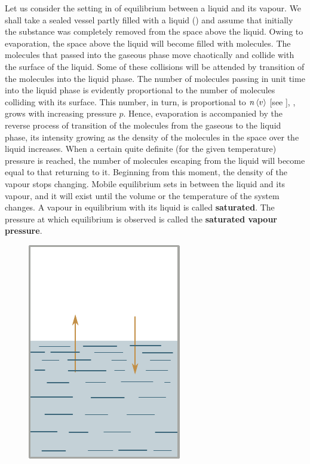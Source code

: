 Let us consider the setting in of equilibrium between a liquid and its vapour. We shall take a sealed vessel partly filled with a liquid () and assume that initially the substance was completely removed from the space above the liquid. Owing to evaporation, the space above the liquid will become filled with molecules. The molecules that passed into the gaseous phase move chaotically and collide with the surface of the liquid. Some of these collisions will be attended by transition of the molecules into the liquid phase. The number of molecules passing in unit time into the liquid phase is evidently proportional to the number of molecules colliding with its surface. This number, in turn, is proportional to $n\left\langle v \right\rangle$ [see ], \ie, grows with increasing pressure $p$. Hence, evaporation is accompanied by the reverse process of transition of the molecules from the gaseous to the liquid phase, its intensity growing as the density of the molecules in the space over the liquid increases. When a certain quite definite (for the given temperature) pressure is reached, the number of molecules escaping from the liquid will become equal to that returning to it. Beginning from this moment, the density of the vapour stops changing. Mobile equilibrium sets in between the liquid and its vapour, and it will exist until the volume or the temperature of the system changes. A vapour in equilibrium with its liquid is called \textbf{saturated}. The pressure at which equilibrium is observed is called the \textbf{saturated vapour pressure}.

\begin{figure}[t]
	\begin{center}
		\includegraphics[scale=0.9]{figures/ch_15/fig_15_1.pdf}
		\caption[]{}
		\label{fig:15_1}
	\end{center}
	\vspace{-0.8cm}
\end{figure}

